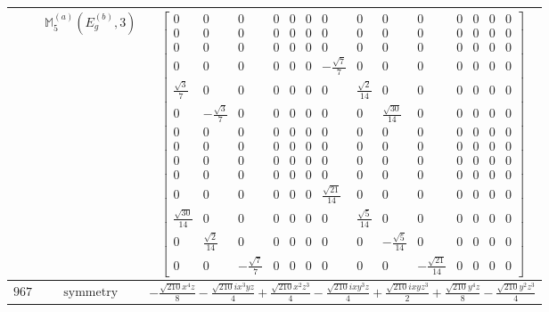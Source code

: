 \documentclass[fleqn,8pt,landscape]{jsarticle}
\begin{document}
\begin{longtable}{ccc}
$  $ & $ \mathbb{M}_{5}^{(a)}(E_{g}^{(b)},3) $ & $ \begin{bmatrix} 0 & 0 & 0 & 0 & 0 & 0 & 0 & 0 & 0 & 0 & 0 & 0 & 0 & 0 \\ 0 & 0 & 0 & 0 & 0 & 0 & 0 & 0 & 0 & 0 & 0 & 0 & 0 & 0 \\ 0 & 0 & 0 & 0 & 0 & 0 & 0 & 0 & 0 & 0 & 0 & 0 & 0 & 0 \\ 0 & 0 & 0 & 0 & 0 & 0 & - \frac{\sqrt{7}}{7} & 0 & 0 & 0 & 0 & 0 & 0 & 0 \\ \frac{\sqrt{3}}{7} & 0 & 0 & 0 & 0 & 0 & 0 & \frac{\sqrt{2}}{14} & 0 & 0 & 0 & 0 & 0 & 0 \\ 0 & - \frac{\sqrt{3}}{7} & 0 & 0 & 0 & 0 & 0 & 0 & \frac{\sqrt{30}}{14} & 0 & 0 & 0 & 0 & 0 \\ 0 & 0 & 0 & 0 & 0 & 0 & 0 & 0 & 0 & 0 & 0 & 0 & 0 & 0 \\ 0 & 0 & 0 & 0 & 0 & 0 & 0 & 0 & 0 & 0 & 0 & 0 & 0 & 0 \\ 0 & 0 & 0 & 0 & 0 & 0 & 0 & 0 & 0 & 0 & 0 & 0 & 0 & 0 \\ 0 & 0 & 0 & 0 & 0 & 0 & 0 & 0 & 0 & 0 & 0 & 0 & 0 & 0 \\ 0 & 0 & 0 & 0 & 0 & 0 & \frac{\sqrt{21}}{14} & 0 & 0 & 0 & 0 & 0 & 0 & 0 \\ \frac{\sqrt{30}}{14} & 0 & 0 & 0 & 0 & 0 & 0 & \frac{\sqrt{5}}{14} & 0 & 0 & 0 & 0 & 0 & 0 \\ 0 & \frac{\sqrt{2}}{14} & 0 & 0 & 0 & 0 & 0 & 0 & - \frac{\sqrt{5}}{14} & 0 & 0 & 0 & 0 & 0 \\ 0 & 0 & - \frac{\sqrt{7}}{7} & 0 & 0 & 0 & 0 & 0 & 0 & - \frac{\sqrt{21}}{14} & 0 & 0 & 0 & 0 \end{bmatrix} $ \\ \hline
$ 967 $ & $ \text{symmetry} $ & $ - \frac{\sqrt{210} x^{4} z}{8} - \frac{\sqrt{210} i x^{3} y z}{4} + \frac{\sqrt{210} x^{2} z^{3}}{4} - \frac{\sqrt{210} i x y^{3} z}{4} + \frac{\sqrt{210} i x y z^{3}}{2} + \frac{\sqrt{210} y^{4} z}{8} - \frac{\sqrt{210} y^{2} z^{3}}{4} $ \\

\end{longtable}
\end{document}
